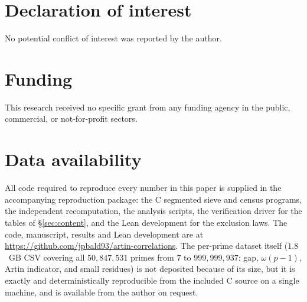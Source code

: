 \section*{Declaration of interest}
No potential conflict of interest was reported by the author.

\section*{Funding}
This research received no specific grant from any funding agency in the public, commercial,
or not-for-profit sectors.

\section*{Data availability}
All code required to reproduce every number in this paper is supplied in the accompanying
reproduction package: the C segmented sieve and census programs, the independent
recomputation, the analysis scripts, the verification driver for the tables of
\S\ref{sec:content}, and the Lean development for the exclusion laws. The code, manuscript,
results and Lean development are at
\url{https://github.com/jpbald93/artin-correlations}. The per-prime dataset itself
($1.8$~GB CSV covering all $50{,}847{,}531$ primes from $7$ to $999{,}999{,}937$: gap,
$\omega(p-1)$, Artin indicator, and small residues) is not deposited because of its size,
but it is exactly and deterministically reproducible from the included C source on a single
machine, and is available from the author on request.
